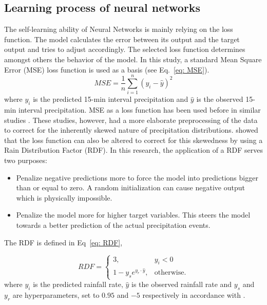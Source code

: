 \documentclass[twocolumn, 10pt, a4paper]{memoir}
\begin{document}
		\subsection{Learning process of neural networks} \label{Learning NN}
		The self-learning ability of Neural Networks is mainly relying on the loss function. The model calculates the error between its output and the target output and tries to adjust accordingly. The selected loss function determines amongst others the behavior of the model. In this study, a standard Mean Square Error (MSE) loss function is used as a basis (see Eq.~\ref{eq: MSE}). 
		\begin{equation} \label{eq: MSE}
			MSE = \frac{1}{n} \sum_{i=1}^{n} (y_i - \hat{y})^2
		\end{equation}
		where ${y_i}$ is the predicted 15-min interval precipitation and $\hat{y}$ is the observed 15-min interval precipitation.
		MSE as a loss function has been used before in similar studies \cite{Pudashine2020, Diba2021}. These studies, however, had a more elaborate preprocessing of the data to correct for the inherently skewed nature of precipitation distributions.  showed that the loss function can also be altered to correct for this skewedness by using a Rain Distribution Factor (RDF). In this research, the application of a RDF serves two purposes:
		
		\begin{itemize}
			\item Penalize negative predictions more to force the model into predictions bigger than or equal to zero. A random initialization can cause negative output which is physically impossible.
			\item Penalize the model more for higher target variables. This steers the model towards a better prediction of the actual precipitation events. 
		\end{itemize} 
	
		The RDF is defined in Eq~\ref{eq: RDF},
		
		\begin{equation} 
			\label{eq: RDF}
			RDF=\begin{cases}
				3, & y_i < 0\\
				1-y_s e^{y_r\cdot{}\hat{y}}, & \text{otherwise}.
			\end{cases}
		\end{equation}	
		where $y_i$ is the predicted rainfall rate, $\hat{y}$ is the observed rainfall rate and $y_s$ and $y_r$ are hyperparameters, set to $0.95$ and $-5$ respectively in accordance with .
		
\end{document}
